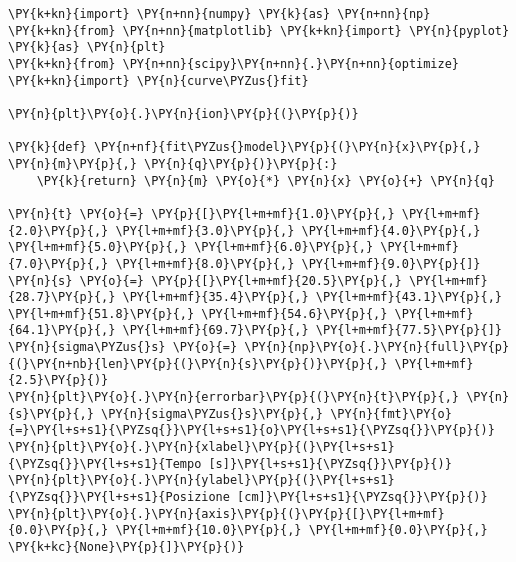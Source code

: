 \begin{Verbatim}[label=\makebox{\href{https://bitbucket.org/lbaldini/statnotes/src/master/snippets/fit\_linear.py}{https://bitbucket.org/.../fit\_linear.py}},commandchars=\\\{\}]
\PY{k+kn}{import} \PY{n+nn}{numpy} \PY{k}{as} \PY{n+nn}{np}
\PY{k+kn}{from} \PY{n+nn}{matplotlib} \PY{k+kn}{import} \PY{n}{pyplot} \PY{k}{as} \PY{n}{plt}
\PY{k+kn}{from} \PY{n+nn}{scipy}\PY{n+nn}{.}\PY{n+nn}{optimize} \PY{k+kn}{import} \PY{n}{curve\PYZus{}fit}

\PY{n}{plt}\PY{o}{.}\PY{n}{ion}\PY{p}{(}\PY{p}{)}

\PY{k}{def} \PY{n+nf}{fit\PYZus{}model}\PY{p}{(}\PY{n}{x}\PY{p}{,} \PY{n}{m}\PY{p}{,} \PY{n}{q}\PY{p}{)}\PY{p}{:}
    \PY{k}{return} \PY{n}{m} \PY{o}{*} \PY{n}{x} \PY{o}{+} \PY{n}{q}

\PY{n}{t} \PY{o}{=} \PY{p}{[}\PY{l+m+mf}{1.0}\PY{p}{,} \PY{l+m+mf}{2.0}\PY{p}{,} \PY{l+m+mf}{3.0}\PY{p}{,} \PY{l+m+mf}{4.0}\PY{p}{,} \PY{l+m+mf}{5.0}\PY{p}{,} \PY{l+m+mf}{6.0}\PY{p}{,} \PY{l+m+mf}{7.0}\PY{p}{,} \PY{l+m+mf}{8.0}\PY{p}{,} \PY{l+m+mf}{9.0}\PY{p}{]}
\PY{n}{s} \PY{o}{=} \PY{p}{[}\PY{l+m+mf}{20.5}\PY{p}{,} \PY{l+m+mf}{28.7}\PY{p}{,} \PY{l+m+mf}{35.4}\PY{p}{,} \PY{l+m+mf}{43.1}\PY{p}{,} \PY{l+m+mf}{51.8}\PY{p}{,} \PY{l+m+mf}{54.6}\PY{p}{,} \PY{l+m+mf}{64.1}\PY{p}{,} \PY{l+m+mf}{69.7}\PY{p}{,} \PY{l+m+mf}{77.5}\PY{p}{]}
\PY{n}{sigma\PYZus{}s} \PY{o}{=} \PY{n}{np}\PY{o}{.}\PY{n}{full}\PY{p}{(}\PY{n+nb}{len}\PY{p}{(}\PY{n}{s}\PY{p}{)}\PY{p}{,} \PY{l+m+mf}{2.5}\PY{p}{)}
\PY{n}{plt}\PY{o}{.}\PY{n}{errorbar}\PY{p}{(}\PY{n}{t}\PY{p}{,} \PY{n}{s}\PY{p}{,} \PY{n}{sigma\PYZus{}s}\PY{p}{,} \PY{n}{fmt}\PY{o}{=}\PY{l+s+s1}{\PYZsq{}}\PY{l+s+s1}{o}\PY{l+s+s1}{\PYZsq{}}\PY{p}{)}
\PY{n}{plt}\PY{o}{.}\PY{n}{xlabel}\PY{p}{(}\PY{l+s+s1}{\PYZsq{}}\PY{l+s+s1}{Tempo [s]}\PY{l+s+s1}{\PYZsq{}}\PY{p}{)}
\PY{n}{plt}\PY{o}{.}\PY{n}{ylabel}\PY{p}{(}\PY{l+s+s1}{\PYZsq{}}\PY{l+s+s1}{Posizione [cm]}\PY{l+s+s1}{\PYZsq{}}\PY{p}{)}
\PY{n}{plt}\PY{o}{.}\PY{n}{axis}\PY{p}{(}\PY{p}{[}\PY{l+m+mf}{0.0}\PY{p}{,} \PY{l+m+mf}{10.0}\PY{p}{,} \PY{l+m+mf}{0.0}\PY{p}{,} \PY{k+kc}{None}\PY{p}{]}\PY{p}{)}


\end{Verbatim}
